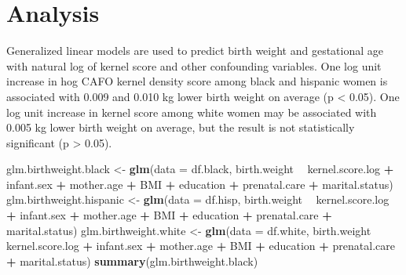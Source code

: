 \documentclass[
  12pt,
]{article}
\newenvironment{Shaded}{\begin{snugshade}}{\end{snugshade}}
\newcommand{\DataTypeTok}[1]{\textcolor[rgb]{0.13,0.29,0.53}{#1}}
\newcommand{\KeywordTok}[1]{\textcolor[rgb]{0.13,0.29,0.53}{\textbf{#1}}}
\newcommand{\NormalTok}[1]{#1}
\newcommand{\OperatorTok}[1]{\textcolor[rgb]{0.81,0.36,0.00}{\textbf{#1}}}
\newcommand{\StringTok}[1]{\textcolor[rgb]{0.31,0.60,0.02}{#1}}
\begin{document}
\newpage

\hypertarget{analysis}{%
\section{Analysis}\label{analysis}}

Generalized linear models are used to predict birth weight and
gestational age with natural log of kernel score and other confounding
variables. One log unit increase in hog CAFO kernel density score among
black and hispanic women is associated with 0.009 and 0.010 kg lower
birth weight on average (p \textless{} 0.05). One log unit increase in
kernel score among white women may be associated with 0.005 kg lower
birth weight on average, but the result is not statistically significant
(p \textgreater{} 0.05).

\begin{Shaded}
\begin{Highlighting}[]
\NormalTok{glm.birthweight.black <-}\StringTok{ }\KeywordTok{glm}\NormalTok{(}\DataTypeTok{data =}\NormalTok{ df.black, }
\NormalTok{                           birth.weight }\OperatorTok{~}\StringTok{ }\NormalTok{kernel.score.log }\OperatorTok{+}\StringTok{ }\NormalTok{infant.sex }\OperatorTok{+}\StringTok{ }\NormalTok{mother.age }\OperatorTok{+}\StringTok{ }
\StringTok{                             }\NormalTok{BMI }\OperatorTok{+}\StringTok{ }\NormalTok{education }\OperatorTok{+}\StringTok{ }\NormalTok{prenatal.care }\OperatorTok{+}\StringTok{ }\NormalTok{marital.status)}
\NormalTok{glm.birthweight.hispanic <-}\StringTok{ }\KeywordTok{glm}\NormalTok{(}\DataTypeTok{data =}\NormalTok{ df.hisp, }
\NormalTok{                           birth.weight }\OperatorTok{~}\StringTok{ }\NormalTok{kernel.score.log }\OperatorTok{+}\StringTok{ }\NormalTok{infant.sex }\OperatorTok{+}\StringTok{ }\NormalTok{mother.age }\OperatorTok{+}\StringTok{ }
\StringTok{                             }\NormalTok{BMI }\OperatorTok{+}\StringTok{ }\NormalTok{education }\OperatorTok{+}\StringTok{ }\NormalTok{prenatal.care }\OperatorTok{+}\StringTok{ }\NormalTok{marital.status)}
\NormalTok{glm.birthweight.white <-}\StringTok{ }\KeywordTok{glm}\NormalTok{(}\DataTypeTok{data =}\NormalTok{ df.white, }
\NormalTok{                           birth.weight }\OperatorTok{~}\StringTok{ }\NormalTok{kernel.score.log }\OperatorTok{+}\StringTok{ }\NormalTok{infant.sex }\OperatorTok{+}\StringTok{ }\NormalTok{mother.age }\OperatorTok{+}\StringTok{ }
\StringTok{                             }\NormalTok{BMI }\OperatorTok{+}\StringTok{ }\NormalTok{education }\OperatorTok{+}\StringTok{ }\NormalTok{prenatal.care }\OperatorTok{+}\StringTok{ }\NormalTok{marital.status)}
\KeywordTok{summary}\NormalTok{(glm.birthweight.black)}
\end{Highlighting}
\end{Shaded}
\end{document}
